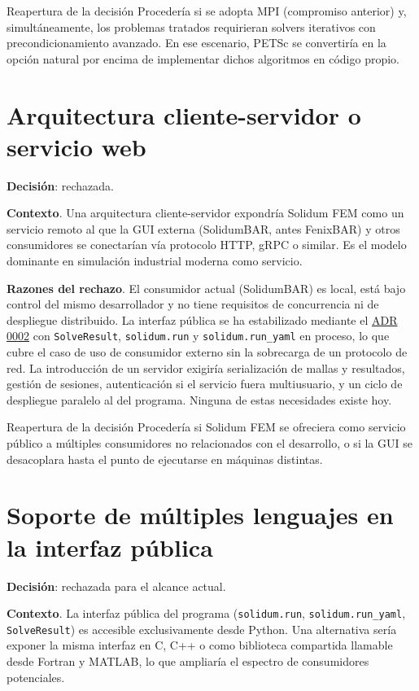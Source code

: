 \documentclass[11pt,oneside]{report}
\begin{document}
\begin{infobox}{Reapertura de la decisión}
Procedería si se adopta MPI (compromiso anterior) y, simultáneamente, los problemas tratados requirieran solvers iterativos con precondicionamiento avanzado. En ese escenario, PETSc se convertiría en la opción natural por encima de implementar dichos algoritmos en código propio.
\end{infobox}

\section{Arquitectura cliente-servidor o servicio web}

\textbf{Decisión}: rechazada.

\textbf{Contexto}. Una arquitectura cliente-servidor expondría Solidum FEM como un servicio remoto al que la GUI externa (SolidumBAR, antes FenixBAR) y otros consumidores se conectarían vía protocolo HTTP, gRPC o similar. Es el modelo dominante en simulación industrial moderna como servicio.

\textbf{Razones del rechazo}. El consumidor actual (SolidumBAR) es local, está bajo control del mismo desarrollador y no tiene requisitos de concurrencia ni de despliegue distribuido. La interfaz pública se ha estabilizado mediante el \hyperref[adr:0002]{ADR 0002} con \texttt{SolveResult}, \texttt{solidum.run} y \texttt{solidum.run\_yaml} en proceso, lo que cubre el caso de uso de consumidor externo sin la sobrecarga de un protocolo de red. La introducción de un servidor exigiría serialización de mallas y resultados, gestión de sesiones, autenticación si el servicio fuera multiusuario, y un ciclo de despliegue paralelo al del programa. Ninguna de estas necesidades existe hoy.

\begin{infobox}{Reapertura de la decisión}
Procedería si Solidum FEM se ofreciera como servicio público a múltiples consumidores no relacionados con el desarrollo, o si la GUI se desacoplara hasta el punto de ejecutarse en máquinas distintas.
\end{infobox}

\section{Soporte de múltiples lenguajes en la interfaz pública}

\textbf{Decisión}: rechazada para el alcance actual.

\textbf{Contexto}. La interfaz pública del programa (\texttt{solidum.run}, \texttt{solidum.run\_yaml}, \texttt{SolveResult}) es accesible exclusivamente desde Python. Una alternativa sería exponer la misma interfaz en C, C++ o como biblioteca compartida llamable desde Fortran y MATLAB, lo que ampliaría el espectro de consumidores potenciales.
\end{document}
